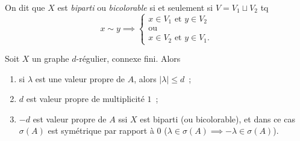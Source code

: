 On dit que $X$ est \emph{biparti} ou \emph{bicolorable} si et
seulement si $V = V_1 \sqcup V_2$ tq 
\[ x \sim y \implies
  \begin{cases}
    x \in V_1 \text{ et } y \in V_2\\
    \text{ou}\\
    x \in V_2 \text{ et } y \in V_1.
  \end{cases}
\]

\begin{prop}
  Soit $X$ un graphe $d$-régulier, connexe fini. Alors
  \begin{enumerate}
  \item si $\lambda$ est une valeur propre de $A$, alors $|\lambda| \leq d$~;
  \item $d$ est valeur propre de multiplicité $1$~;
  \item $-d$ est valeur propre de $A$ ssi $X$ est biparti (ou bicolorable), et dans ce cas $\sigma(A)$ est
    symétrique par rapport à $0$ ($\lambda \in \sigma(A) \implies -\lambda \in \sigma(A)$).
  \end{enumerate}

\end{prop}


